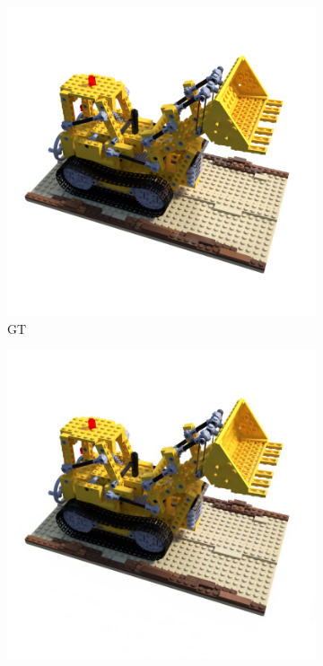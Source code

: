 \documentclass[12pt, a4paper, twoside]{book}
\numberwithin{equation}{chapter}
\numberwithin{theorem}{section}
\numberwithin{definition}{section}
\numberwithin{definitionChapter}{chapter}
\begin{document}
	\begin{figure}[H]
		\centering
		\begin{subfigure}{0.475\textwidth}
			\centering
			\includegraphics[scale=0.25]{img/gt/gt_lego_31.png}
			\caption{GT}
		\end{subfigure}
		\begin{subfigure}{0.475\textwidth}
			\centering
			\includegraphics[scale=0.25]{img/nerf/nerf_lego_31.jpg}

\end{subfigure}
\end{figure}
\end{document}
